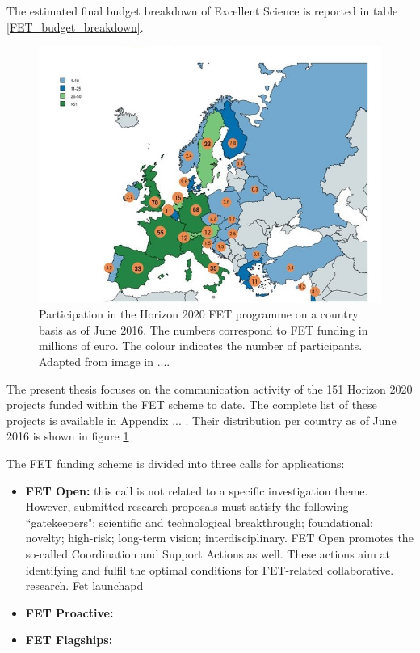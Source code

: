 The estimated final budget breakdown of Excellent Science is reported in table \ref{FET_budget_breakdown}.

\begin{figure}[!t] 
 \begin{center}
 \includegraphics[scale=0.3]{Images/Country_participation_in_H2020_FET_projects.jpg}
 \caption{Participation in the Horizon 2020 FET programme on a country basis as of June 2016. The numbers correspond to FET funding in millions of euro. The colour indicates the number of participants. Adapted from image in ....}
 \label{Country_participation_in_H2020_FET_projects}
 \end{center}
\end{figure}


The present thesis focuses on the communication activity of the 151 Horizon 2020 projects funded within the FET scheme to date. The complete list of these projects is available in Appendix ... . Their distribution per country as of June 2016 is shown in figure \ref{Country_participation_in_H2020_FET_projects}

The FET funding scheme is divided into three calls for applications:

\begin{itemize}
 \item \textbf{FET Open:} this call is not related to a specific investigation theme. However, submitted research proposals must satisfy the following ``gatekeepers": scientific and technological breakthrough; foundational; novelty; high-risk; long-term vision; interdisciplinary. FET Open promotes the so-called Coordination and Support Actions as well. These actions aim at identifying and fulfil the optimal conditions for FET-related collaborative.  research. Fet launchapd
 \item \textbf{FET Proactive:}
 \item \textbf{FET Flagships:} 
\end{itemize}

